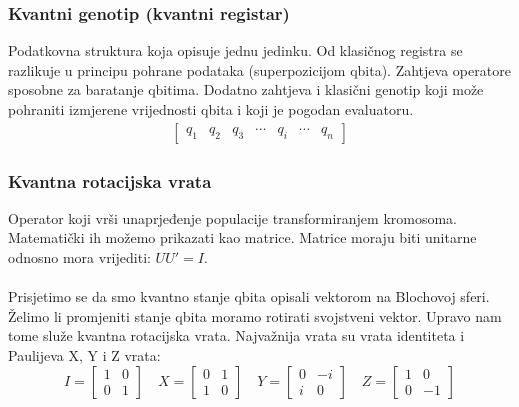 \documentclass[times, utf8, zavrsni]{fer}
\begin{document}
\subsubsection{Kvantni genotip (kvantni registar)}
Podatkovna struktura koja opisuje jednu jedinku. Od klasičnog registra se razlikuje u principu pohrane podataka (superpozicijom qbita). Zahtjeva operatore sposobne za baratanje qbitima. Dodatno zahtjeva i klasični genotip koji može pohraniti izmjerene vrijednosti qbita i koji je pogodan evaluatoru.
\begin{align*}
\begin{bmatrix}
q_1 & q_2 & q_3 & \cdots & q_i & \cdots & q_n
\end{bmatrix}
\end{align*}

\subsubsection{Kvantna rotacijska vrata}
Operator koji vrši unaprjeđenje populacije transformiranjem kromosoma. Matematički ih možemo prikazati kao matrice. Matrice moraju biti unitarne odnosno mora vrijediti: $UU' = I$.

\paragraph{}
Prisjetimo se da smo kvantno stanje qbita opisali vektorom na Blochovoj sferi. Želimo li promjeniti stanje qbita moramo rotirati svojstveni vektor. Upravo nam tome služe kvantna rotacijska vrata. Najvažnija vrata su vrata identiteta i Paulijeva X, Y i Z vrata:
\begin{equation}
I = 
\begin{bmatrix}
1 & 0 \\ 0 & 1
\end{bmatrix} \quad
X = 
\begin{bmatrix}
0 & 1 \\ 1 & 0
\end{bmatrix} \quad
Y = 
\begin{bmatrix}
0 & -i \\ i & 0
\end{bmatrix} \quad
Z = 
\begin{bmatrix}
1 & 0 \\ 0 & -1
\end{bmatrix}
\end{equation}
\end{document}
